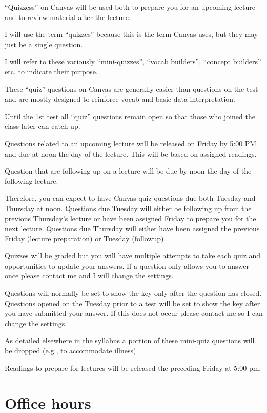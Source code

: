 \documentclass[
]{book}
\begin{document}
``Quizzess'' on Canvas will be used both to prepare you for an upcoming lecture and to review material after the lecture.

I will use the term ``quizzes'' because this is the term Canvas uses, but they may just be a single question.

I will refer to these variously ``mini-quizzes'', ``vocab builders'', ``concept builders'' etc. to indicate their purpose.

These ``quiz'' questions on Canvas are generally easier than questions on the test and are mostly designed to reinforce vocab and basic data interpretation.

Until the 1st test all ``quiz'' questions remain open so that those who joined the class later can catch up.

Questions related to an upcoming lecture will be released on Friday by 5:00 PM and due at noon the day of the lecture. This will be based on assigned readings.

Question that are following up on a lecture will be due by noon the day of the following lecture.

Therefore, you can expect to have Canvas quiz questions due both Tuesday and Thursday at noon. Questions due Tuesday will either be following up from the previous Thursday's lecture or have been assigned Friday to prepare you for the next lecture. Questions due Thursday will either have been assigned the previous Friday (lecture preparation) or Tuesday (followup).

Quizzes will be graded but you will have multiple attempts to take each quiz and opportunities to update your answers. If a question only allows you to answer once please contact me and I will change the settings.

Questions will normally be set to show the key only after the question has closed. Questions opened on the Tuesday prior to a test will be set to show the key after you have submitted your answer. If this does not occur please contact me so I can change the settings.

As detailed elsewhere in the syllabus a portion of these mini-quiz questions will be dropped (e.g., to accommodate illness).

Readings to prepare for lectures will be released the preceding Friday at 5:00 pm.

\hypertarget{office-hours}{%
\chapter{Office hours}\label{office-hours}}
\end{document}
